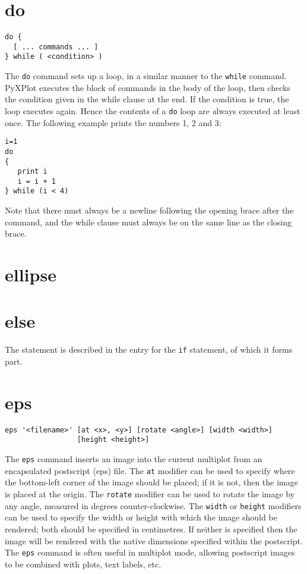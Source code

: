 \section{do}

\begin{verbatim}
do {
  [ ... commands ... ]
} while ( <condition> )
\end{verbatim}

The {\tt do} command sets up a loop, in a similar manner to the {\tt while}
command.  PyXPlot executes the block of commands in the body of the loop, then
checks the condition given in the while clause at the end.  If the condition is
true, the loop executes again.  Hence the contents of a {\tt do} loop are {\emph
always} executed at least once.  The following example prints the numbers 1, 2
and 3:

\begin{verbatim}
i=1
do
{
   print i
   i = i + 1
} while (i < 4)
\end{verbatim}

Note that there must always be a newline following the opening brace after the
 command, and the while clause must always be on the same line as the
closing brace.


\section{ellipse}


\section{else}

The  statement is described in the entry for the {\tt if}
statement, of which it forms part.


\section{eps}

\begin{verbatim}
eps '<filename>' [at <x>, <y>] [rotate <angle>] [width <width>]
                 [height <height>]
\end{verbatim}

The {\tt eps} command inserts an image into the current multiplot from an
encapsulated postscript (eps) file.  The {\tt at} modifier can be used to
specify where the bottom-left corner of the image should be placed; if it is
not, then the image is placed at the origin. The {\tt rotate} modifier can be
used to rotate the image by any angle, measured in degrees counter-clockwise.
The {\tt width} or {\tt height} modifiers can be used to specify the width or
height with which the image should be rendered; both should be specified in
centimetres. If neither is specified then the image will be rendered with the
native dimensions specified within the postscript.  The {\tt eps} command is
often useful in multiplot mode, allowing postscript images to be combined with
plots, text labels, etc.


